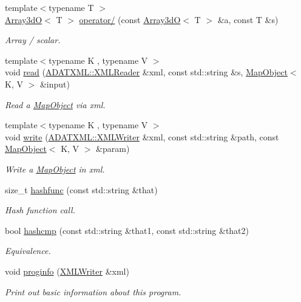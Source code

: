 \begin{DoxyCompactItemize}
{\footnotesize template$<$typename T $>$ }\\\mbox{\hyperlink{classADAT_1_1Array3dO}{Array3dO}}$<$ T $>$ \mbox{\hyperlink{namespaceADAT_a12fe989a3965397dc5f1f6003582023f}{operator/}} (const \mbox{\hyperlink{classADAT_1_1Array3dO}{Array3dO}}$<$ T $>$ \&a, const T \&s)
\begin{DoxyCompactList}\small\item\em Array / scalar. \end{DoxyCompactList}\item 
{\footnotesize template$<$typename K , typename V $>$ }\\void \mbox{\hyperlink{namespaceADAT_ab1cb4aab951dd138f8f0a73f5c3ead6d}{read}} (\mbox{\hyperlink{classADATXML_1_1XMLReader}{A\+D\+A\+T\+X\+M\+L\+::\+X\+M\+L\+Reader}} \&xml, const std\+::string \&s, \mbox{\hyperlink{classADAT_1_1MapObject}{Map\+Object}}$<$ K, V $>$ \&input)
\begin{DoxyCompactList}\small\item\em Read a \mbox{\hyperlink{classADAT_1_1MapObject}{Map\+Object}} via xml. \end{DoxyCompactList}\item 
{\footnotesize template$<$typename K , typename V $>$ }\\void \mbox{\hyperlink{namespaceADAT_a38920c20e5e4ccb234f9a05e436a4faa}{write}} (\mbox{\hyperlink{classADATXML_1_1XMLWriter}{A\+D\+A\+T\+X\+M\+L\+::\+X\+M\+L\+Writer}} \&xml, const std\+::string \&path, const \mbox{\hyperlink{classADAT_1_1MapObject}{Map\+Object}}$<$ K, V $>$ \&param)
\begin{DoxyCompactList}\small\item\em Write a \mbox{\hyperlink{classADAT_1_1MapObject}{Map\+Object}} in xml. \end{DoxyCompactList}\item 
size\+\_\+t \mbox{\hyperlink{namespaceADAT_ac0708a73475d6ed645b663e2d919f90b}{hashfunc}} (const std\+::string \&that)
\begin{DoxyCompactList}\small\item\em Hash function call. \end{DoxyCompactList}\item 
bool \mbox{\hyperlink{namespaceADAT_a3145f853c462f1c95b958f5deb7709a5}{hashcmp}} (const std\+::string \&that1, const std\+::string \&that2)
\begin{DoxyCompactList}\small\item\em Equivalence. \end{DoxyCompactList}\item 
void \mbox{\hyperlink{namespaceADAT_a93a8baf56c435bc0fe7bd252601f28f6}{proginfo}} (\mbox{\hyperlink{classADATXML_1_1XMLWriter}{X\+M\+L\+Writer}} \&xml)
\begin{DoxyCompactList}\small\item\em Print out basic information about this program. \end{DoxyCompactList}\end{DoxyCompactItemize}


